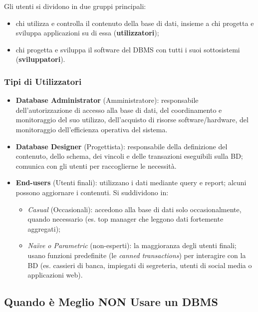\documentclass[12pt, a4paper]{article}
\begin{document}
Gli utenti si dividono in due gruppi principali:
\begin{itemize}
    \item chi utilizza e controlla il contenuto della base di dati, insieme a chi progetta e sviluppa applicazioni su di essa (\textbf{utilizzatori});
    \item chi progetta e sviluppa il software del DBMS con tutti i suoi sottosistemi (\textbf{sviluppatori}).
\end{itemize}

\subsubsection{Tipi di Utilizzatori}
\begin{itemize}
    \item \textbf{Database Administrator} (Amministratore): responsabile dell'autorizzazione di accesso alla base di dati, del coordinamento e monitoraggio del suo utilizzo, dell'acquisto di risorse software/hardware, del monitoraggio dell'efficienza operativa del sistema.
    \item \textbf{Database Designer} (Progettista): responsabile della definizione del contenuto, dello schema, dei vincoli e delle transazioni eseguibili sulla BD; comunica con gli utenti per raccoglierne le necessità.
    \item \textbf{End-users} (Utenti finali): utilizzano i dati mediante query e report; alcuni possono aggiornare i contenuti. Si suddividono in:
    \begin{itemize}
        \item \textit{Casual} (Occasionali): accedono alla base di dati solo occasionalmente, quando necessario (es. top manager che leggono dati fortemente aggregati);
        \item \textit{Naïve o Parametric} (non-esperti): la maggioranza degli utenti finali; usano funzioni predefinite (le \textit{canned transactions}) per interagire con la BD (es. cassieri di banca, impiegati di segreteria, utenti di social media o applicazioni web).
    \end{itemize}
\end{itemize}

\subsection{Quando è Meglio NON Usare un DBMS}
\end{document}
